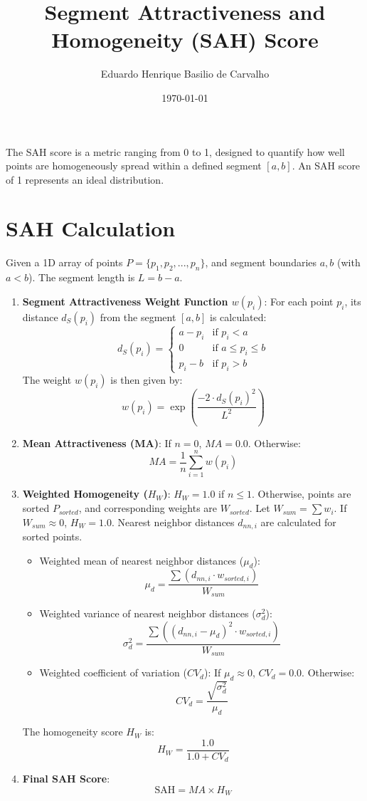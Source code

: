 \documentclass{article}
\title{Segment Attractiveness and Homogeneity (SAH) Score}
\author{Eduardo Henrique Basilio de Carvalho}
\date{\today}
\begin{document}
\maketitle

The SAH score is a metric ranging from 0 to 1, designed to quantify how well points are homogeneously spread within a defined segment $[a, b]$. An SAH score of 1 represents an ideal distribution.

\section{SAH Calculation}
Given a 1D array of points $P = \{p_1, p_2, ..., p_n\}$, and segment boundaries $a, b$ (with $a < b$). The segment length is $L = b - a$.

\begin{enumerate}
    \item \textbf{Segment Attractiveness Weight Function $w(p_i)$}:
    For each point $p_i$, its distance $d_S(p_i)$ from the segment $[a,b]$ is calculated:
    $$ d_S(p_i) = \begin{cases} a - p_i & \text{if } p_i < a \\ 0 & \text{if } a \le p_i \le b \\ p_i - b & \text{if } p_i > b \end{cases} $$
    The weight $w(p_i)$ is then given by:
    $$ w(p_i) = \exp\left(\frac{-2 \cdot d_S(p_i)^2}{L^2}\right) $$

    \item \textbf{Mean Attractiveness (MA)}:
    If $n=0$, $MA=0.0$. Otherwise:
    $$ MA = \frac{1}{n} \sum_{i=1}^{n} w(p_i) $$

    \item \textbf{Weighted Homogeneity ($H_W$)}:
    $H_W = 1.0$ if $n \le 1$. Otherwise, points are sorted $P_{sorted}$, and corresponding weights are $W_{sorted}$.
    Let $W_{sum} = \sum w_i$. If $W_{sum} \approx 0$, $H_W = 1.0$.
    Nearest neighbor distances $d_{nn,i}$ are calculated for sorted points.
    \begin{itemize}
        \item Weighted mean of nearest neighbor distances ($\mu_d$):
        $$ \mu_d = \frac{\sum (d_{nn,i} \cdot w_{sorted,i})}{W_{sum}} $$
        \item Weighted variance of nearest neighbor distances ($\sigma_d^2$):
        $$ \sigma_d^2 = \frac{\sum ((d_{nn,i} - \mu_d)^2 \cdot w_{sorted,i})}{W_{sum}} $$
        \item Weighted coefficient of variation ($CV_d$):
        If $\mu_d \approx 0$, $CV_d = 0.0$. Otherwise:
        $$ CV_d = \frac{\sqrt{\sigma_d^2}}{\mu_d} $$
    \end{itemize}
    The homogeneity score $H_W$ is:
    $$ H_W = \frac{1.0}{1.0 + CV_d} $$

    \item \textbf{Final SAH Score}:
    $$ \text{SAH} = MA \times H_W $$
\end{enumerate}
\end{document}
